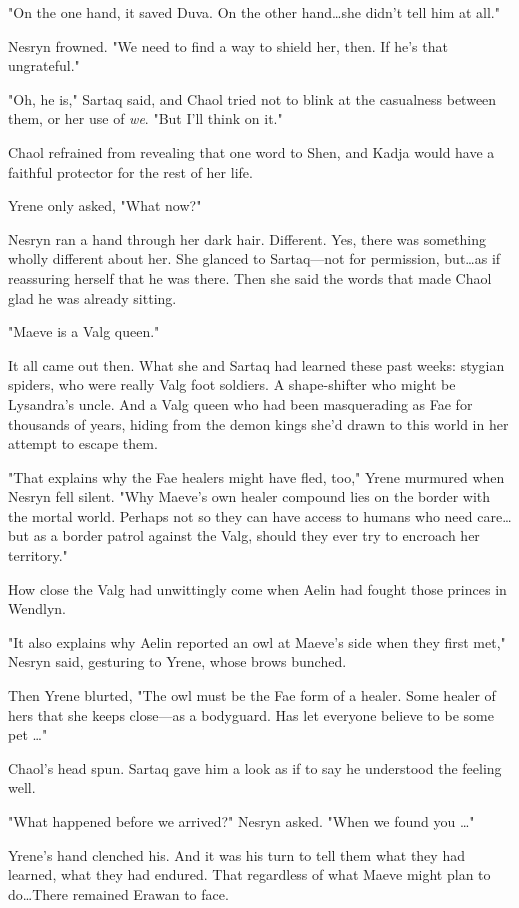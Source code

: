 "On the one hand, it saved Duva.
On the other hand\ldots she didn't tell him at all."

Nesryn frowned.
"We need to find a way to shield her, then.
If he's that ungrateful."

"Oh, he is," Sartaq said, and Chaol tried not to blink at the casualness between them, or her use of \emph{we}.
"But I'll think on it."

Chaol refrained from revealing that one word to Shen, and Kadja would have a faithful protector for the rest of her life.

Yrene only asked, "What now?"

Nesryn ran a hand through her dark hair.
Different.
Yes, there was something wholly different about her.
She glanced to Sartaq---not for permission, but\ldots as if reassuring herself that he was there.
Then she said the words that made Chaol glad he was already sitting.

"Maeve is a Valg queen."

It all came out then.
What she and Sartaq had learned these past weeks:
stygian spiders, who were really Valg foot soldiers.
A shape-shifter who might be Lysandra's uncle.
And a Valg queen who had been masquerading as Fae for thousands of years, hiding from the demon kings she'd drawn to this world in her attempt to escape them.

"That explains why the Fae healers might have fled, too," Yrene murmured when Nesryn fell silent.
"Why Maeve's own healer compound lies on the border with the mortal world.
Perhaps not so they can have access to humans who need care\ldots but as a border patrol against the Valg, should they ever try to encroach her territory."

How close the Valg had unwittingly come when Aelin had fought those princes in Wendlyn.

"It also explains why Aelin reported an owl at Maeve's side when they first met," Nesryn said, gesturing to Yrene, whose brows bunched.

Then Yrene blurted, "The owl must be the Fae form of a healer.
Some healer of hers that she keeps close---as a bodyguard.
Has let everyone believe to be some pet \ldots"

Chaol's head spun.
Sartaq gave him a look as if to say he understood the feeling well.

"What happened before we arrived?"
Nesryn asked.
"When we found you \ldots"

Yrene's hand clenched his.
And it was his turn to tell them what they had learned, what they had endured.
That regardless of what Maeve might plan to do\ldots There remained Erawan to face.

